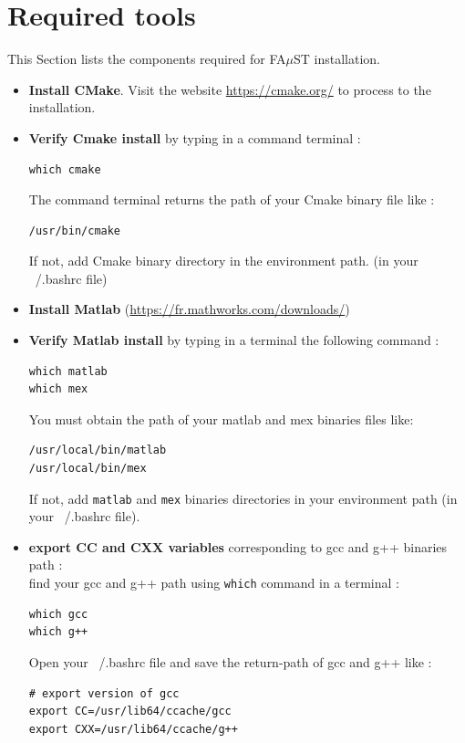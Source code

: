 \section{Required tools}\label{sec:RequiredTools}
This Section lists the components required for FA$\mu$ST installation. 
\begin{itemize}
\item \textbf{Install CMake}. Visit the website \url{https://cmake.org/} to process to the installation.
\item \textbf{Verify Cmake install} by typing in a command terminal : 
\begin{lstlisting}
which cmake
\end{lstlisting}
The command terminal returns the path of your Cmake binary file like :
\begin{lstlisting}
/usr/bin/cmake
\end{lstlisting}
If not, add Cmake binary directory in the environment path. (in your ~/.bashrc file)

\item \textbf{Install Matlab} (\url{https://fr.mathworks.com/downloads/})

\item \textbf{Verify Matlab install} by typing in a terminal the following command : 
\begin{lstlisting}
which matlab
which mex
\end{lstlisting}
You must obtain the path of your matlab and mex binaries files like: 
\begin{lstlisting}
/usr/local/bin/matlab
/usr/local/bin/mex
\end{lstlisting}
If not, add \texttt{matlab} and \texttt{mex} binaries directories in your environment path (in your ~/.bashrc file). 

\item \textbf{export CC and CXX variables} corresponding to gcc and g++ binaries path :\\
find your gcc and g++ path using \texttt{which} command in a terminal :
\begin{lstlisting}
which gcc
which g++
\end{lstlisting}

Open your ~/.bashrc file and save the return-path of gcc and g++ like : \\
\begin{lstlisting}
# export version of gcc
export CC=/usr/lib64/ccache/gcc
export CXX=/usr/lib64/ccache/g++
\end{lstlisting}
\end{itemize}


